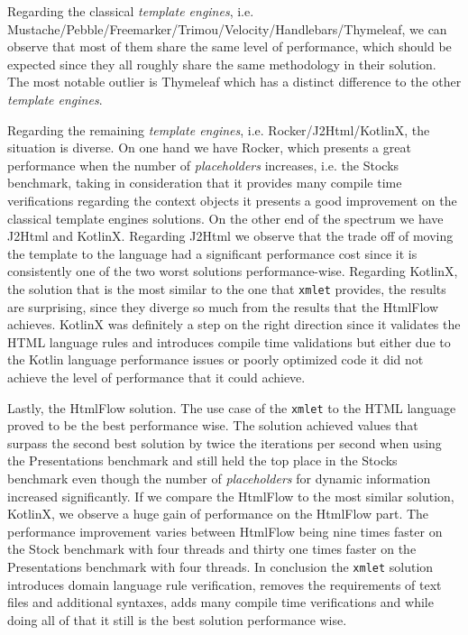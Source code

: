 \noindent
Regarding the classical \textit{template engines}, i.e. Mustache/Pebble/Freemarker/Trimou/Velocity/Handlebars/Thymeleaf, we can observe that most of them share the same level of performance, which should be expected since they all roughly share the same methodology in their solution. The most notable outlier is Thymeleaf which has a distinct difference to the other \textit{template engines}.

\noindent
Regarding the remaining \textit{template engines}, i.e. Rocker/J2Html/KotlinX, the situation is diverse. On one hand we have Rocker, which presents a great performance when the number of \textit{placeholders} increases, i.e. the Stocks benchmark, taking in consideration that it provides many compile time verifications regarding the context objects it presents a good improvement on the classical template engines solutions. On the other end of the spectrum we have J2Html and KotlinX. Regarding J2Html we observe that the trade off of moving the template to the language had a significant performance cost since it is consistently one of the two worst solutions performance-wise. Regarding KotlinX, the solution that is the most similar to the one that \texttt{xmlet} provides, the results are surprising, since they diverge so much from the results that the HtmlFlow achieves. KotlinX was definitely a step on the right direction since it validates the \ac{HTML} language rules and introduces compile time validations but either due to the Kotlin language performance issues or poorly optimized code it did not achieve the level of performance that it could achieve.

\noindent
Lastly, the HtmlFlow solution. The use case of the \texttt{xmlet} to the \ac{HTML} language proved to be the best performance wise. The solution achieved values that surpass the second best solution by twice the iterations per second when using the Presentations benchmark and still held the top place in the Stocks benchmark even though the number of \textit{placeholders} for dynamic information increased significantly. If we compare the HtmlFlow to the most similar solution, KotlinX, we observe a huge gain of performance on the HtmlFlow part. The performance improvement varies between HtmlFlow being nine times faster on the Stock benchmark with four threads and thirty one times faster on the Presentations benchmark with four threads. In conclusion the \texttt{xmlet} solution introduces domain language rule verification, removes the requirements of text files and additional syntaxes, adds many compile time verifications and while doing all of that it still is the best solution performance wise.
